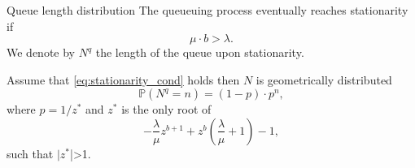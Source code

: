 \documentclass{beamer}
\begin{document}
\begin{frame}{Queue length distribution}
\scriptsize
The queueuing process eventually reaches stationarity if 
\begin{equation}\label{eq:stationarity_cond}
\mu\cdot b > \lambda.
\end{equation}
We denote by $N^q$ the length of the queue upon stationarity. 
\begin{tcolorbox}[enhanced,drop shadow, title=The blockchain efficiency theorem]
Assume that \eqref{eq:stationarity_cond} holds then $N$ is geometrically distributed 
$$
\mathbb{P}(N^q = n) = (1-p)\cdot p^n,
$$
where $p = 1/z^\ast$ and $z^\ast$ is the only root of 
$$
-\frac{\lambda}{\mu}z^{b+1}+z^b\left(\frac{\lambda}{\mu}+1\right) - 1,
$$
such that $|z^\ast$|>1.  
\end{tcolorbox}
\end{frame}
\end{document}
